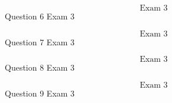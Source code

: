 \documentclass{article}
\begin{document}
    $$\text{Exam 3}$$
    Question 6 Exam 3
    \pagebreak

    $$\text{Exam 3}$$
    Question 7 Exam 3
    \pagebreak

    $$\text{Exam 3}$$
    Question 8 Exam 3
    \pagebreak

    $$\text{Exam 3}$$
    Question 9 Exam 3
    \pagebreak
\end{document}
